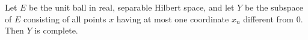 Let $E$ be the unit ball in real, separable Hilbert space, and let $Y$ be the subspace of $E$ consisting of all points $x$ having at most one coordinate $x_n$ different from $0$. Then $Y$ is complete.
